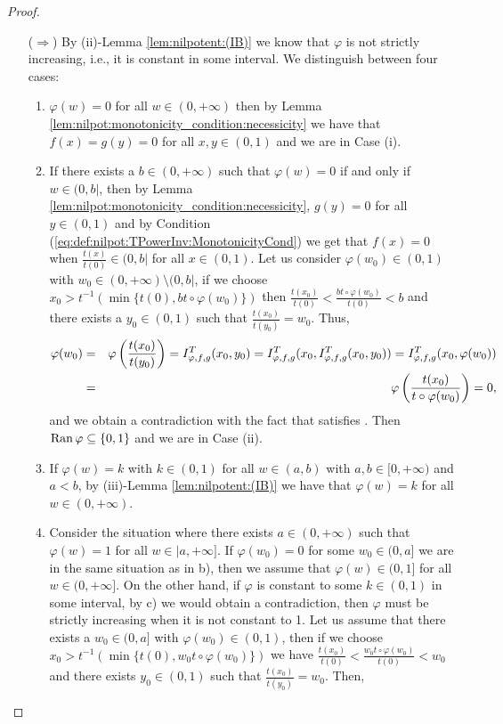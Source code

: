 \begin{proof}
\begin{itemize}
	\item[($\Rightarrow$)] By (ii)-Lemma \ref{lem:nilpotent:(IB)} we know that $\varphi$ is not strictly increasing, i.e., it is constant in some interval. We distinguish between four cases:
	\begin{enumerate}[label=\alph*)]
		\item $\varphi(w)=0$ for all $w \in (0,+\infty)$ then by Lemma \ref{lem:nilpot:monotonicity_condition:necessicity} we have that $f(x)=g(y)=0$ for all $x,y \in (0,1)$ and we are in Case (i).
		\item If there exists a $b \in (0,+\infty)$ such that $\varphi(w)=0$ if and only if $w \in (0,b|$, then by Lemma \ref{lem:nilpot:monotonicity_condition:necessicity}, $g(y)=0$ for all $y \in (0,1)$ and by Condition (\ref{eq:def:nilpot:TPowerInv:MonotonicityCond}) we get that $f(x)=0$ when $\frac{t(x)}{t(0)} \in (0,b|$ for all $x \in (0,1)$. Let us consider $\varphi(w_0) \in (0,1)$ with $w_0 \in (0,+\infty) \setminus (0,b|$, if we choose $x_0>t^{-1} (\min \{t(0),bt \circ \varphi(w_0)\})$ then $\frac{t(x_0)}{t(0)}< \frac{b t \circ \varphi(w_0)}{t(0)}<b$ and there exists a $y_0 \in (0,1)$ such that $\frac{t(x_0)}{t(y_0)}=w_0$. Thus,
		\begin{eqnarray*}
			\varphi(w_0)&=&\varphi \left(\frac{t(x_0)}{t(y_0)}\right) = I^T_{\varphi,f,g}(x_0,y_0) = I^T_{\varphi,f,g}(x_0,I^T_{\varphi,f,g}(x_0,y_0)) = I^T_{\varphi,f,g}(x_0,\varphi(w_0)) \\
			&=& \varphi \left(\frac{t(x_0)}{t \circ \varphi(w_0)}\right)=0,
		\end{eqnarray*}
		and we obtain a contradiction with the fact that \IT satisfies \IB. Then $\operatorname{Ran} \varphi \subseteq \{0,1\}$ and we are in Case (ii).
		\item If $\varphi(w)=k$ with $k \in (0,1)$ for all $w \in (a,b)$ with $a,b \in [0,+\infty)$ and $a<b$, by (iii)-Lemma \ref{lem:nilpotent:(IB)} we have that $\varphi(w)=k$ for all $w \in (0,+\infty)$.
		\item Consider the situation where there exists $a \in (0,+\infty)$ such that $\varphi(w)=1$ for all $w \in |a,+\infty]$. If $\varphi(w_0)=0$ for some $w_0 \in (0,a]$ we are in the same situation as in b), then we assume that $\varphi(w) \in (0,1]$ for all $w \in (0,+\infty]$. On the other hand, if $\varphi$ is constant to some $k \in (0,1)$ in some interval, by c) we would obtain a contradiction, then $\varphi$ must be strictly increasing when it is not constant to 1. Let us assume that there exists a $w_0 \in (0,a]$ with $\varphi(w_0) \in (0,1)$, then if we choose $x_0 > t^{-1}(\min \{t(0), w_0 t \circ \varphi(w_0)\})$ we have $\frac{t(x_0)}{t(0)} < \frac{w_0 t \circ \varphi(w_0)}{t(0)} < w_0$ and there exists $y_0 \in (0,1)$ such that $\frac{t(x_0)}{t(y_0)}=w_0$. Then,

\end{enumerate}
\end{itemize}
\end{proof}
